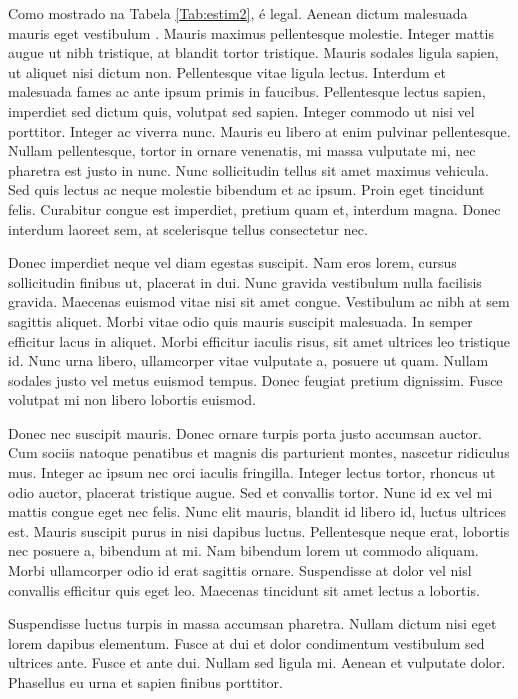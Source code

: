 \begin{btUnit}
Como mostrado na Tabela \ref{Tab:estim2}, é legal. Aenean dictum
malesuada mauris eget vestibulum \citep{Cockerham1996}. Mauris maximus
pellentesque molestie. Integer mattis augue ut nibh tristique, at
blandit tortor tristique. Mauris sodales ligula sapien, ut aliquet
nisi dictum non. Pellentesque vitae ligula lectus. Interdum et
malesuada fames ac ante ipsum primis in faucibus. Pellentesque lectus
sapien, imperdiet sed dictum quis, volutpat sed sapien. Integer
commodo ut nisi vel porttitor. Integer ac viverra nunc. Mauris eu
libero at enim pulvinar pellentesque. Nullam pellentesque, tortor in
ornare venenatis, mi massa vulputate mi, nec pharetra est justo in
nunc. Nunc sollicitudin tellus sit amet maximus vehicula. Sed quis
lectus ac neque molestie bibendum et ac ipsum. Proin eget tincidunt
felis. Curabitur congue est imperdiet, pretium quam et, interdum
magna. Donec interdum laoreet sem, at scelerisque tellus consectetur
nec.


Donec imperdiet neque vel diam egestas suscipit. Nam eros lorem,
cursus sollicitudin finibus ut, placerat in dui. Nunc gravida
vestibulum nulla facilisis gravida. Maecenas euismod vitae nisi sit
amet congue. Vestibulum ac nibh at sem sagittis aliquet. Morbi vitae
odio quis mauris suscipit malesuada. In semper efficitur lacus in
aliquet. Morbi efficitur iaculis risus, sit amet ultrices leo
tristique id. Nunc urna libero, ullamcorper vitae vulputate a, posuere
ut quam. Nullam sodales justo vel metus euismod tempus. Donec feugiat
pretium dignissim. Fusce volutpat mi non libero lobortis euismod.


Donec nec suscipit mauris. Donec ornare turpis porta justo accumsan
auctor. Cum sociis natoque penatibus et magnis dis parturient montes,
nascetur ridiculus mus. Integer ac ipsum nec orci iaculis fringilla.
Integer lectus tortor, rhoncus ut odio auctor, placerat tristique
augue. Sed et convallis tortor. Nunc id ex vel mi mattis congue eget
nec felis. Nunc elit mauris, blandit id libero id, luctus ultrices
est. Mauris suscipit purus in nisi dapibus luctus. Pellentesque neque
erat, lobortis nec posuere a, bibendum at mi. Nam bibendum lorem ut
commodo aliquam. Morbi ullamcorper odio id erat sagittis ornare.
Suspendisse at dolor vel nisl convallis efficitur quis eget leo.
Maecenas tincidunt sit amet lectus a lobortis.

Suspendisse luctus turpis in massa accumsan pharetra. Nullam dictum
nisi eget lorem dapibus elementum. Fusce at dui et dolor condimentum
vestibulum sed ultrices ante. Fusce et ante dui. Nullam sed ligula mi.
Aenean et vulputate dolor. Phasellus eu urna et sapien finibus
porttitor.


\end{btUnit}
